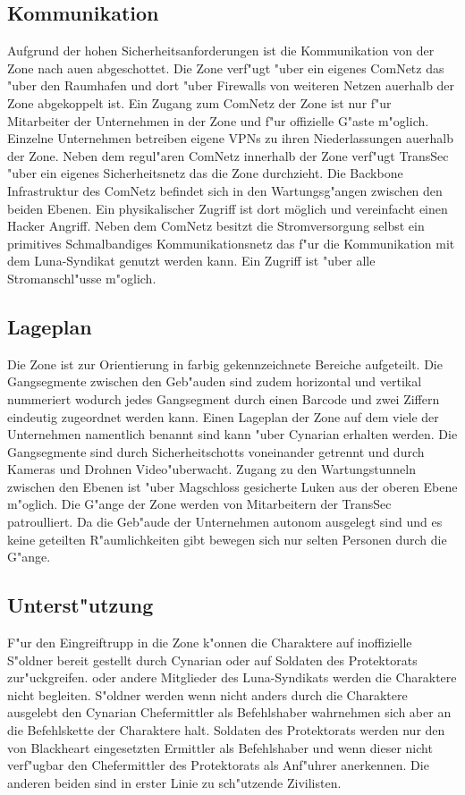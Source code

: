\subsection{Kommunikation} 
Aufgrund der hohen Sicherheitsanforderungen ist die Kommunikation von der Zone nach au\3en abgeschottet. Die Zone verf"ugt "uber ein eigenes ComNetz das "uber den Raumhafen und dort "uber Firewalls von weiteren Netzen au\3erhalb der Zone abgekoppelt ist. Ein Zugang zum ComNetz der Zone ist nur f"ur Mitarbeiter der Unternehmen in der Zone und f"ur offizielle G"aste m"oglich. Einzelne Unternehmen betreiben eigene VPNs zu ihren Niederlassungen au\3erhalb der Zone. Neben dem regul"aren ComNetz innerhalb der Zone verf"ugt TransSec "uber ein eigenes Sicherheitsnetz das die Zone durchzieht. Die Backbone Infrastruktur des ComNetz befindet sich in den Wartungsg"angen zwischen den beiden Ebenen. Ein physikalischer Zugriff ist dort möglich und vereinfacht einen Hacker Angriff. Neben dem ComNetz besitzt die Stromversorgung selbst ein primitives Schmalbandiges Kommunikationsnetz das f"ur die Kommunikation mit dem Luna-Syndikat genutzt werden kann. Ein Zugriff ist "uber alle Stromanschl"usse m"oglich.

\subsection{Lageplan} 
Die Zone ist zur Orientierung in farbig gekennzeichnete Bereiche aufgeteilt. Die Gangsegmente zwischen den Geb"auden sind zudem horizontal und vertikal nummeriert wodurch jedes Gangsegment durch einen Barcode und zwei Ziffern eindeutig zugeordnet werden kann. Einen Lageplan der Zone auf dem viele der Unternehmen namentlich benannt sind kann "uber Cynarian erhalten werden. Die Gangsegmente sind durch Sicherheitschotts voneinander getrennt und durch Kameras und Drohnen Video"uberwacht. Zugang zu den Wartungstunneln zwischen den Ebenen ist "uber Magschloss gesicherte Luken aus der oberen Ebene m"oglich. Die G"ange der Zone werden von Mitarbeitern der TransSec patroulliert. Da die Geb"aude der Unternehmen autonom ausgelegt sind und es keine geteilten R"aumlichkeiten gibt bewegen sich nur selten Personen durch die G"ange.

\subsection{Unterst"utzung} 
F"ur den Eingreiftrupp in die Zone k"onnen die Charaktere auf inoffizielle S"oldner bereit gestellt durch Cynarian oder auf Soldaten des Protektorats zur"uckgreifen. \xl{} oder andere Mitglieder des Luna-Syndikats werden die Charaktere nicht begleiten. S"oldner werden wenn nicht anders durch die Charaktere ausgelebt den Cynarian Chefermittler als Befehlshaber wahrnehmen sich aber an die Befehlskette der Charaktere halt. Soldaten des Protektorats werden nur den von Blackheart eingesetzten Ermittler als Befehlshaber und wenn dieser nicht verf"ugbar den Chefermittler des Protektorats als Anf"uhrer anerkennen. Die anderen beiden sind in erster Linie zu sch"utzende Zivilisten.

